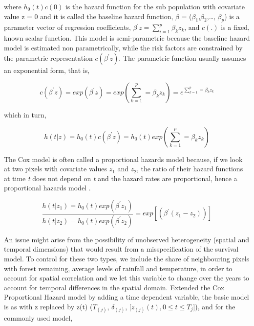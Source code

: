 where $h_{0}(t)c(0)$ is the hazard function for the sub population with covariate value z = 0 and it is called the baseline hazard function, $\beta$ = ($\beta_{1}$,$\beta_{2}$,\dots, $\beta_{p}$) is a parameter vector of regression coefficients, $\beta^{'}z = \sum^{p}_{i=1}\beta_{k}z_{k}$, and $c(.)$ is a fixed, known scalar function. This model is semi-parametric because the baseline hazard model is estimated non parametrically, while the risk factors are constrained by the parametric representation $c(\beta^{'}z)$. The parametric function usually assumes an exponential form, that is, 

\begin{center}
\begin{equation}
c(\beta^{'}z) = exp(\beta^{'}z) = exp(\sum^{p}_{k=1}=\beta_{k}z_{k}) = e^{\sum^{p}_{k=1}=\beta_{k}z_{k}}  \label{eq:5} 
\end{equation}
\end{center}

which in turn, 

\begin{center}
\begin{equation}
h(t|z) = h_{0}(t)c(\beta^{'}z) = h_{0}(t) exp(\sum^{p}_{k=1}=\beta_{k}z_{k}) \label{eq:6} 
\end{equation}
\end{center}

The Cox model is often called a proportional hazards model because, if we look at two pixels with covariate values $z_{1}$ and $z_{2}$, the ratio of their hazard functions at time \textit{t} does not depend on \textit{t} and the hazard rates are proportional, hence a proportional hazards model \citep{cao_2005}.

\begin{center}
\begin{equation}
\frac{h(t|z_{1}) = h_{0}(t)exp(\beta^{'}z_{1})}{h(t|z_{2}) = h_{0}(t)exp(\beta^{'}z_{2})} = exp[(\beta^{'}(z_{1} - z_{2}))]  \label{eq:7} 
\end{equation}
\end{center}


An issue might arise from the possibility of unobserved heterogeneity (spatial and temporal dimensions) that would result from a misspecification of the survival model. To control for these two types, we include the share of neighbouring pixels with forest remaining, average levels of rainfall and temperature, in order to account for spatial correlation and we let this variable to change over the years to account for temporal differences in the spatial domain. Extended the Cox Proportional Hazard model by adding a time dependent variable, the basic model is as with z replaced by z(t) ($T_{(j)}$, $\delta_{(j)}$, [$z_{(j)}(t), 0 \leq t \leq T_{j}$]), and for the
commonly used model,

